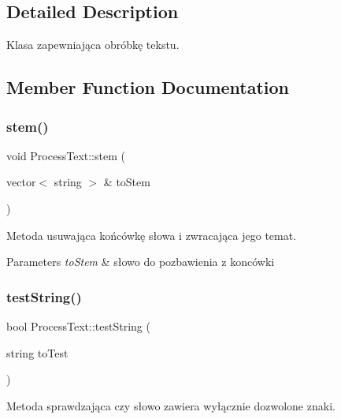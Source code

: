 \subsection{Detailed Description}
Klasa zapewniająca obróbkę tekstu. 

\subsection{Member Function Documentation}
\mbox{\label{class_process_text_a54127c710af4a6539544e1d347075acf}} 
\subsubsection{\texorpdfstring{stem()}{stem()}}
{\footnotesize\ttfamily void Process\+Text\+::stem (\begin{DoxyParamCaption}\item[{vector$<$ string $>$ \&}]{to\+Stem }\end{DoxyParamCaption})\hspace{0.3cm}{\ttfamily [protected]}}



Metoda usuwająca końcówkę słowa i zwracająca jego temat. 


\begin{DoxyParams}{Parameters}
{\em to\+Stem} & słowo do pozbawienia z koncówki \\
\hline
\end{DoxyParams}
\mbox{\label{class_process_text_ada619b70f0cbcc68862fb329f42db958}} 
\subsubsection{\texorpdfstring{testString()}{testString()}}
{\footnotesize\ttfamily bool Process\+Text\+::test\+String (\begin{DoxyParamCaption}\item[{string}]{to\+Test }\end{DoxyParamCaption})\hspace{0.3cm}{\ttfamily [protected]}}



Metoda sprawdzająca czy słowo zawiera wyłącznie dozwolone znaki. 


